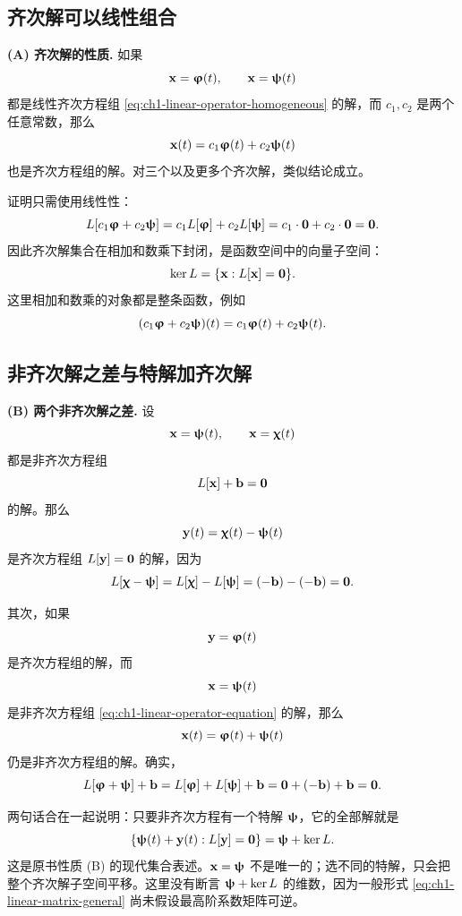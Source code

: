 \subsection{齐次解可以线性组合}

\textbf{(A) 齐次解的性质.} 如果
\[
 \vect{x}=\vect{\varphi}(t),
 \qquad
 \vect{x}=\vect{\psi}(t)
\]
都是线性齐次方程组 \eqref{eq:ch1-linear-operator-homogeneous} 的解，而 \(c_1,c_2\) 是两个任意常数，那么
\begin{equation}
 \vect{x}(t)=c_1\vect{\varphi}(t)+c_2\vect{\psi}(t)
 \label{eq:ch1-homogeneous-combination}
\end{equation}
也是齐次方程组的解。对三个以及更多个齐次解，类似结论成立。

证明只需使用线性性：
\[
 L[c_1\vect{\varphi}+c_2\vect{\psi}]
 =c_1L[\vect{\varphi}]+c_2L[\vect{\psi}]
 =c_1\cdot\vect{0}+c_2\cdot\vect{0}=\vect{0}.
\]
因此齐次解集合在相加和数乘下封闭，是函数空间中的向量子空间：
\[
 \ker L
 =
 \{\vect{x}:L[\vect{x}]=\vect{0}\}.
\]
这里相加和数乘的对象都是整条函数，例如
\[
 (c_1\vect{\varphi}+c_2\vect{\psi})(t)
 =c_1\vect{\varphi}(t)+c_2\vect{\psi}(t).
\]

\subsection{非齐次解之差与特解加齐次解}

\textbf{(B) 两个非齐次解之差.} 设
\[
 \vect{x}=\vect{\psi}(t),
 \qquad
 \vect{x}=\vect{\chi}(t)
\]
都是非齐次方程组
\[
 L[\vect{x}]+\vect{b}=\vect{0}
\]
的解。那么
\begin{equation}
 \vect{y}(t)=\vect{\chi}(t)-\vect{\psi}(t)
 \label{eq:ch1-difference-of-solutions}
\end{equation}
是齐次方程组 \(L[\vect{y}]=\vect{0}\) 的解，因为
\[
 L[\vect{\chi}-\vect{\psi}]=L[\vect{\chi}]-L[\vect{\psi}]=(-\vect{b})-(-\vect{b})=\vect{0}.
\]

其次，如果
\[
 \vect{y}=\vect{\varphi}(t)
\]
是齐次方程组的解，而
\[
 \vect{x}=\vect{\psi}(t)
\]
是非齐次方程组 \eqref{eq:ch1-linear-operator-equation} 的解，那么
\begin{equation}
 \vect{x}(t)=\vect{\varphi}(t)+\vect{\psi}(t)
 \label{eq:ch1-particular-plus-homogeneous}
\end{equation}
仍是非齐次方程组的解。确实，
\[
 L[\vect{\varphi}+\vect{\psi}]+\vect{b}
 =L[\vect{\varphi}]+L[\vect{\psi}]+\vect{b}
 =\vect{0}+(-\vect{b})+\vect{b}=\vect{0}.
\]

两句话合在一起说明：只要非齐次方程有一个特解 \(\vect{\psi}\)，它的全部解就是
\begin{equation}
 \{\vect{\psi}(t)+\vect{y}(t):L[\vect{y}]=\vect{0}\}
 =\vect{\psi}+\ker L.
 \label{eq:ch1-affine-solution-set}
\end{equation}
这是原书性质 (B) 的现代集合表述。\(\vect{x}=\vect{\psi}\) 不是唯一的；选不同的特解，只会把整个齐次解子空间平移。这里没有断言 \(\vect{\psi}+\ker L\) 的维数，因为一般形式 \eqref{eq:ch1-linear-matrix-general} 尚未假设最高阶系数矩阵可逆。

